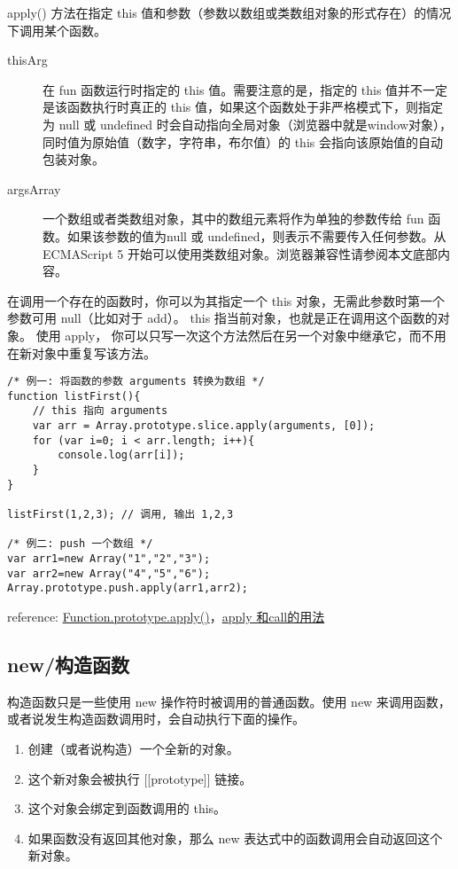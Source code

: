apply() 方法在指定 this 值和参数（参数以数组或类数组对象的形式存在）的情况下调用某个函数。

\begin{description}
\item[thisArg] 在 fun 函数运行时指定的 this 值。需要注意的是，指定的 this 值并不一定是该函数执行时真正的 this 值，如果这个函数处于非严格模式下，则指定为 null 或 undefined 时会自动指向全局对象（浏览器中就是window对象），同时值为原始值（数字，字符串，布尔值）的 this 会指向该原始值的自动包装对象。



\item[argsArray] 一个数组或者类数组对象，其中的数组元素将作为单独的参数传给 fun 函数。如果该参数的值为null 或 undefined，则表示不需要传入任何参数。从ECMAScript 5 开始可以使用类数组对象。浏览器兼容性请参阅本文底部内容。
\end{description}

在调用一个存在的函数时，你可以为其指定一个 this 对象，无需此参数时第一个参数可用 null（比如对于 add）。 this 指当前对象，也就是正在调用这个函数的对象。 使用 apply， 你可以只写一次这个方法然后在另一个对象中继承它，而不用在新对象中重复写该方法。

\begin{verbatim}/* 例一: 将函数的参数 arguments 转换为数组 */
function listFirst(){
    // this 指向 arguments
    var arr = Array.prototype.slice.apply(arguments, [0]);
    for (var i=0; i < arr.length; i++){
        console.log(arr[i]);
    }
}

listFirst(1,2,3); // 调用, 输出 1,2,3

/* 例二: push 一个数组 */
var arr1=new Array("1","2","3");
var arr2=new Array("4","5","6");
Array.prototype.push.apply(arr1,arr2); 
\end{verbatim}

reference: \href{https://developer.mozilla.org/zh-CN/docs/Web/JavaScript/Reference/Global\_Objects/Function/apply}{Function.prototype.apply()}，\href{http://segmentfault.com/a/1190000000725712}{apply 和call的用法}

\subsection{new/构造函数}\hypertarget{new}{}\label{new}

构造函数只是一些使用 new 操作符时被调用的普通函数。使用 new 来调用函数，或者说发生构造函数调用时，会自动执行下面的操作。

\begin{enumerate}
\item 创建（或者说构造）一个全新的对象。
\item 这个新对象会被执行 [[prototype]] 链接。
\item 这个对象会绑定到函数调用的 this。
\item 如果函数没有返回其他对象，那么 new 表达式中的函数调用会自动返回这个新对象。
\end{enumerate}

